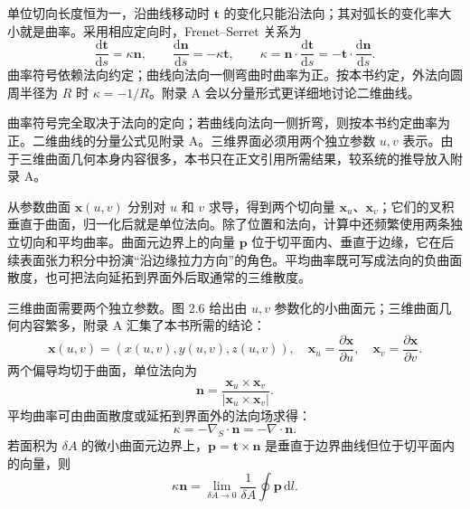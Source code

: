 \documentclass[11pt,a4paper,openany,fontset=none]{ctexbook}
\newenvironment{sourceblock}
  {\par\addvspace{0.65\baselineskip}\noindent\begin{minipage}{\linewidth}\centering}
  {\end{minipage}\par\addvspace{0.48\baselineskip}}
\begin{document}
\begin{sourceblock}
\end{sourceblock}

单位切向长度恒为一，沿曲线移动时 $\bm t$ 的变化只能沿法向；其对弧长的变化率大小就是曲率。采用相应定向时，Frenet--Serret 关系为
\begin{equation}
 \frac{\mathrm d\bm t}{\mathrm ds}=\kappa\bm n,\qquad
 \frac{\mathrm d\bm n}{\mathrm ds}=-\kappa\bm t,\qquad
 \kappa=\bm n\cdot\frac{\mathrm d\bm t}{\mathrm ds}=-\bm t\cdot\frac{\mathrm d\bm n}{\mathrm ds}. \tag{2.28--2.30}
\end{equation}
曲率符号依赖法向约定；曲线向法向一侧弯曲时曲率为正。按本书约定，外法向圆周半径为 $R$ 时 $\kappa=-1/R$。附录 A 会以分量形式更详细地讨论二维曲线。

曲率符号完全取决于法向的定向；若曲线向法向一侧折弯，则按本书约定曲率为正。二维曲线的分量公式见附录 A。三维界面必须用两个独立参数 $u,v$ 表示。由于三维曲面几何本身内容很多，本书只在正文引用所需结果，较系统的推导放入附录 A。

从参数曲面 $\bm x(u,v)$ 分别对 $u$ 和 $v$ 求导，得到两个切向量 $\bm x_u$、$\bm x_v$；它们的叉积垂直于曲面，归一化后就是单位法向。除了位置和法向，计算中还频繁使用两条独立切向和平均曲率。曲面元边界上的向量 $\bm p$ 位于切平面内、垂直于边缘，它在后续表面张力积分中扮演“沿边缘拉力方向”的角色。平均曲率既可写成法向的负曲面散度，也可把法向延拓到界面外后取通常的三维散度。

\begin{sourceblock}
\end{sourceblock}

三维曲面需要两个独立参数。图 2.6 给出由 $u,v$ 参数化的小曲面元；三维曲面几何内容繁多，附录 A 汇集了本书所需的结论：
\begin{equation}
 \bm x(u,v)=(x(u,v),y(u,v),z(u,v)),\quad
 \bm x_u=\frac{\partial\bm x}{\partial u},\quad
 \bm x_v=\frac{\partial\bm x}{\partial v}. \tag{2.31--2.32}
\end{equation}
两个偏导均切于曲面，单位法向为
\begin{equation}
 \bm n=\frac{\bm x_u\times\bm x_v}{|\bm x_u\times\bm x_v|}. \tag{2.33}
\end{equation}
平均曲率可由曲面散度或延拓到界面外的法向场求得：
\begin{equation}
 \kappa=-\nabla_S\cdot\bm n=-\nabla\cdot\bm n. \tag{2.34--2.35}
\end{equation}
若面积为 $\delta A$ 的微小曲面元边界上，$\bm p=\bm t\times\bm n$ 是垂直于边界曲线但位于切平面内的向量，则
\begin{equation}
 \kappa\bm n=\lim_{\delta A\to0}\frac1{\delta A}\oint\bm p\,\mathrm dl. \tag{2.36}
\end{equation}
\end{document}
